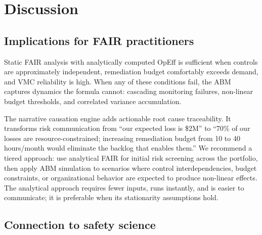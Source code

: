 \documentclass[11pt,a4paper]{article}
\begin{document}
\section{Discussion}
\label{sec:discussion}

\subsection{Implications for FAIR practitioners}

Static FAIR analysis with analytically computed OpEff is sufficient when controls are approximately independent, remediation budget comfortably exceeds demand, and VMC reliability is high. When any of these conditions fail, the ABM captures dynamics the formula cannot: cascading monitoring failures, non-linear budget thresholds, and correlated variance accumulation.

The narrative causation engine adds actionable root cause traceability. It transforms risk communication from ``our expected loss is \$2M'' to ``70\% of our losses are resource-constrained; increasing remediation budget from 10 to 40 hours/month would eliminate the backlog that enables them.'' We recommend a tiered approach: use analytical FAIR for initial risk screening across the portfolio, then apply ABM simulation to scenarios where control interdependencies, budget constraints, or organizational behavior are expected to produce non-linear effects. The analytical approach requires fewer inputs, runs instantly, and is easier to communicate; it is preferable when its stationarity assumptions hold.

\subsection{Connection to safety science}
\end{document}

